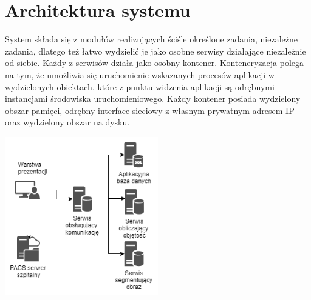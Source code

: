 \documentclass[a4paper,11pt,twoside]{report}
\theoremstyle{definition}
\begin{document}
\section{Architektura systemu}

System składa się z modułów realizujących ściśle określone zadania, niezależne zadania, dlatego też łatwo wydzielić je jako osobne serwisy działające niezależnie od siebie. Każdy z serwisów działa jako osobny kontener. Konteneryzacja polega na tym, że umożliwia się uruchomienie wskazanych procesów aplikacji w wydzielonych obiektach, które z punktu widzenia aplikacji są odrębnymi instancjami środowiska uruchomieniowego. Każdy kontener posiada wydzielony obszar pamięci, odrębny interface sieciowy z własnym prywatnym adresem IP oraz wydzielony obszar na dysku.

\begin{minipage}{\linewidth}
	\centering
	\includegraphics[width=0.5\textwidth]{Architektura.png}
\end{minipage}
\end{document}
